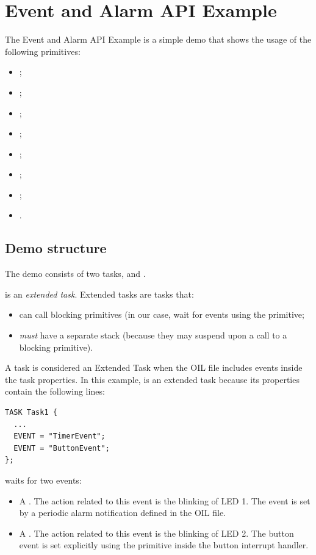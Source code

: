 \chapter{Event and Alarm API Example}

The Event and Alarm API Example is a simple demo that shows the usage of the
following primitives:
\begin{itemize}
\item {};
\item {};
\item {};
\item {};
\item {};
\item {};
\item {};
\item {}.
\end{itemize}

\section{Demo structure}

The demo consists of two tasks,  and .

 is an \emph{extended task}. Extended tasks are tasks that:
\begin{itemize}
\item can call blocking primitives (in our case, wait for events using
  the  primitive;
\item {\em must} have a separate stack (because they may suspend upon
a call to a blocking primitive).
\end{itemize}
A task is considered an Extended Task when the OIL file includes
events inside the task properties. In this example,  is an
extended task because its properties contain the following lines:

\begin{lstlisting}
TASK Task1 {
  ...
  EVENT = "TimerEvent";
  EVENT = "ButtonEvent";
};
\end{lstlisting}

 waits for two events:
\begin{itemize}
\item A . The action related to this event is the
  blinking of LED 1. The event is set by a periodic alarm notification
   defined in the OIL file.

\item A . The action related to this event is the
  blinking of LED 2. The button event is set explicitly using the
   primitive inside the button interrupt handler.
\end{itemize}

